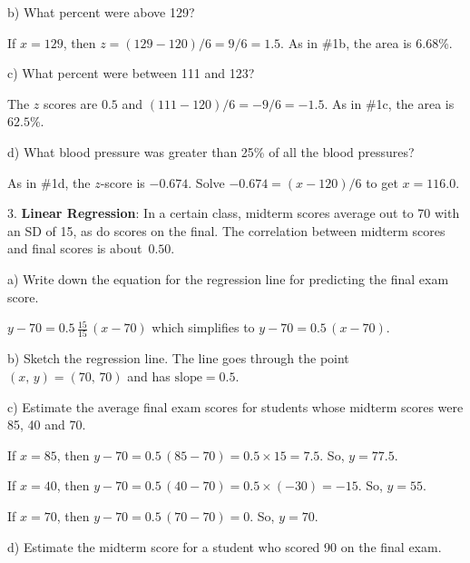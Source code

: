 \documentclass[10pt]{article}
\begin{document}
\hspace{10pt} b) What percent were above 129?

{\color{blue} If $x=129$, then $z=(129-120)/6=9/6=1.5$.  As in \#1b, the area is $6.68$\%.}
\vspace{0.8in}

\hspace{10pt} c) What percent were between 111 and 123?

{\color{blue} The $z$ scores are $0.5$ and $(111-120)/6=-9/6=-1.5$.  As in \#1c, the area is $62.5$\%.}
\vspace{0.8in}

\hspace{10pt} d) What blood pressure was greater than 25\% of all the blood pressures?

{\color{blue} As in \#1d, the $z$-score is $-0.674$.  Solve $-0.674 = (x-120)/6$ to get $x=116.0$.}
\vfill
\eject

3. \textbf{Linear Regression}:
In a certain class, midterm scores average out to 70 with an SD of 15, as do 
scores on the final.  The correlation between midterm scores and final scores is 
about~$0.50$.   

\hspace{20pt} a) Write down the equation for the regression line for predicting the final exam score.

{\color{blue} $y-70 = 0.5\,\frac{15}{15}\,(x-70)$ which simplifies to $y-70 = 0.5\,(x-70)$.}
\vspace{0.6in}

\hspace{20pt} b) Sketch the regression line.  {\color{blue} The line goes through the point
  $(x,\,y)=(70,\, 70)$ and has $\mbox{slope}=0.5$.}
\vspace{1.25in}

\hspace{20pt} c) 
Estimate the average final exam scores for students whose midterm scores were
85, 40 and 70. %

{\color{blue}
If $x=85$, then $y-70 = 0.5\,(85 - 70)=0.5\times 15 = 7.5$.  So, $y=77.5$.

If $x=40$, then $y-70 = 0.5\,(40-70) = 0.5\times (-30) = -15$.  So, $y=55$.

If $x=70$, then $y-70 = 0.5\,(70-70) = 0$.  So, $y=70$.}
\vspace{2.0in}

\hspace{20pt} d) Estimate the midterm score for a student who scored 90 on the final exam.
\end{document}
